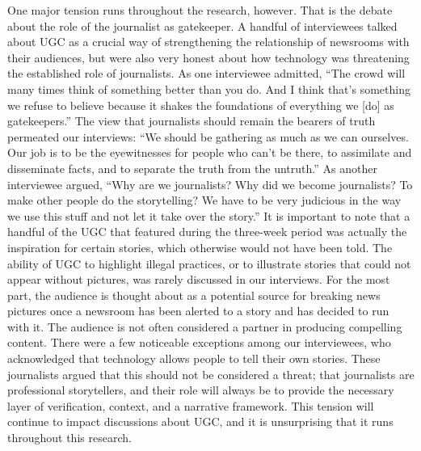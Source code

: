 \begin{enumerate}
One major tension runs throughout the research, however. That is the
debate about the role of the journalist as gatekeeper. A handful of interviewees
talked about UGC as a crucial way of strengthening the relationship
of newsrooms with their audiences, but were also very honest about
how technology was threatening the established role of journalists. As one
interviewee admitted, ``The crowd will many times think of something better
than you do. And I think that's something we refuse to believe because it
shakes the foundations of everything we [do] as gatekeepers.''
The view that journalists should remain the bearers of truth permeated our
interviews: ``We should be gathering as much as we can ourselves. Our job
is to be the eyewitnesses for people who can't be there, to assimilate and
disseminate facts, and to separate the truth from the untruth.''
As another interviewee argued, ``Why are we journalists? Why did we
become journalists? To make other people do the storytelling? We have
to be very judicious in the way we use this stuff and not let it take over
the story.''
It is important to note that a handful of the UGC that featured during the
three-week period was actually the inspiration for certain stories, which
otherwise would not have been told. The ability of UGC to highlight illegal
practices, or to illustrate stories that could not appear without pictures, was
rarely discussed in our interviews.
For the most part, the audience is thought about as a potential source for
breaking news pictures once a newsroom has been alerted to a story and
has decided to run with it. The audience is not often considered a partner
in producing compelling content. There were a few noticeable exceptions
among our interviewees, who acknowledged that technology allows people
to tell their own stories. These journalists argued that this should not be
considered a threat; that journalists are professional storytellers, and their
role will always be to provide the necessary layer of verification, context,
and a narrative framework. This tension will continue to impact discussions
about UGC, and it is unsurprising that it runs throughout this research.


\end{enumerate}
